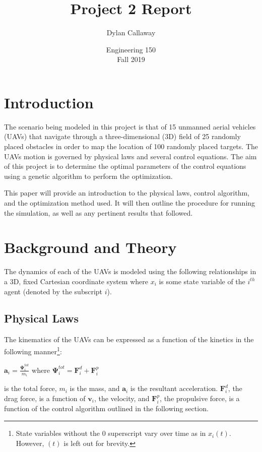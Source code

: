 \documentclass[a4paper,12pt]{report}
\begin{document}
\title{Project 2 Report}
\author{Dylan Callaway}
\date{Engineering 150 \\ Fall 2019}
\maketitle

\tableofcontents
\newpage
{}

\section{Introduction}
The scenario being modeled in this project is that of 15 unmanned aerial vehicles (UAVs) that navigate through a three-dimensional (3D) field of 25 randomly placed obstacles in order to map the location of 100 randomly placed targets. The UAVs motion is governed by physical laws and several control equations. The aim of this project is to determine the optimal parameters of the control equations using a genetic algorithm to perform the optimization.

This paper will provide an introduction to the physical laws, control algorithm, and the optimization method used. It will then outline the procedure for running the simulation, as well as any pertinent results that followed.


\section{Background and Theory}
The dynamics of each of the UAVs is modeled using the following relationships in a 3D, fixed Cartesian coordinate system where $x_i$ is some state variable of the $i^{th}$ agent (denoted by the subscript $i$).

\subsection{Physical Laws}
The kinematics of the UAVs can be expressed as a function of the kinetics in the following manner\footnote{State variables without the $0$ superscript vary over time as in $x_i(t)$. However, $(t)$ is left out for brevity.}:
\begin{center}
$\bm{a}_i = \frac{\bm{\Psi}^{tot}_i}{m_i}$ \quad where \quad $\bm{\Psi}^{tot}_i = \bm{F}^d_i +\bm{F}^p_i$
\end{center}
 is the total force, $m_i$ is the mass, and $\bm{a}_i$ is the resultant acceleration. $\bm{F}^d_i$, the drag force, is a function of $\bm{v}_i$, the velocity, and $\bm{F}^p_i$, the propulsive force, is a function of the control algorithm outlined in the following section.
 
\end{document}
